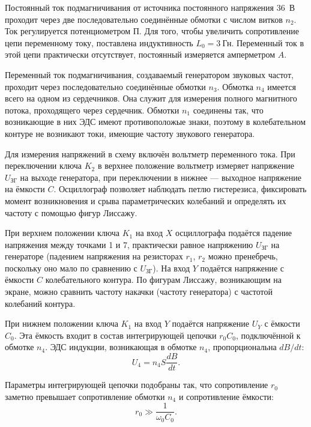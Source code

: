 Постоянный ток подмагничивания от источника постоянного напряжения 36~В проходит через две последовательно соединённые обмотки с числом витков $n_2$. Ток регулируется потенциометром $\text{П}$. Для того, чтобы увеличить сопротивление цепи переменному току, поставлена индуктивность $L_0 = 3~$Гн. Переменный ток в этой цепи практически отсутствует, постоянный измеряется амперметром $A$. 

Переменный ток подмагничивания, создаваемый генератором звуковых частот, проходит через последовательно соединённые обмотки $n_3$. Обмотка $n_4$ имеется всего на одном из сердечников. Она служит для измерения полного магнитного потока, проходящего через сердечник. Обмотки $n_1$ соединены так, что возникающие в них ЭДС имеют противоположые знаки, поэтому в колебательном контуре не возникают токи, имеющие частоту звукового генератора. 

Для измерения напряжений в схему включён вольтметр переменного тока. При переключении ключа $K_2$ в верхнее положение вольтметр измеряет напряжение $U_\text{ЗГ}$ на выходе генератора, при переключении в нижнее --- выходное напряжение на ёмкости $C$. Осциллограф позволяет наблюдать петлю гистерезиса, фиксировать момент возникновения и срыва параметрических колебаний и определять их частоту с помощью фигур Лиссажу. 

При верхнем положении ключа $K_1$ на вход $X$ осциллографа подаётся падение напряжения между точками 1 и 7, практически равное напряжению $U_{\text{ЗГ}}$ на генераторе (падением напряжения на резисторах $r_1$, $r_2$ можно пренебречь, поскольку оно мало по сравнению с $U_{\text{ЗГ}}$). На вход $Y$ подаётся напряжение с ёмкости $C$ колебательного контура. По фигурам Лиссажу, возникающим на экране, можно сравнить частоту накачки (частоту генератора) с частотой колебаний контура. 

При нижнем положении ключа $K_1$ на вход $Y$ подаётся напряжение $U_Y$ с ёмкости $C_0$. Эта ёмкость входит в состав интегрирующей цепочки $r_0C_0$, подключённой к обмотке $n_4$. ЭДС индукции, возникающая в обмотке $n_4$, пропорциональна $dB/dt$: 
\begin{equation*}
	U_4 = n_4S\frac{dB}{dt}.
\end{equation*}

Параметры интегрирующей цепочки подобраны так, что сопротивление $r_0$ заметно превышает сопротивление обмотки $n_4$ и сопротивление ёмкости: 
\begin{equation*}
	r_0 \gg \frac{1}{\omega_0C_0}.
\end{equation*}

